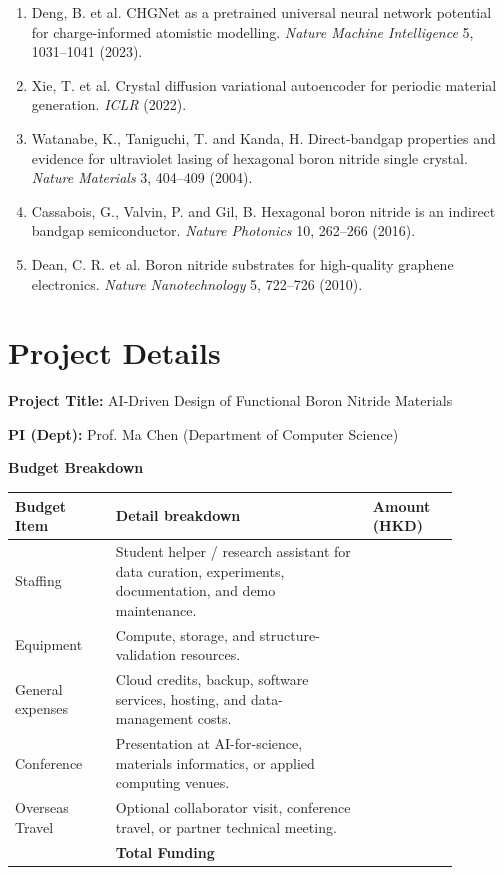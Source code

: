 \documentclass[10pt]{article}
\newcommand{\blank}[1][8em]{\colorbox{yellow!35}{\rule{0pt}{1.1em}\hspace{#1}}}
\begin{document}
\begin{enumerate}[leftmargin=1.2em,itemsep=1pt]
  \item Deng, B. et al. CHGNet as a pretrained universal neural network potential for charge-informed atomistic modelling. \textit{Nature Machine Intelligence} 5, 1031--1041 (2023).
  \item Xie, T. et al. Crystal diffusion variational autoencoder for periodic material generation. \textit{ICLR} (2022).
  \item Watanabe, K., Taniguchi, T. and Kanda, H. Direct-bandgap properties and evidence for ultraviolet lasing of hexagonal boron nitride single crystal. \textit{Nature Materials} 3, 404--409 (2004).
  \item Cassabois, G., Valvin, P. and Gil, B. Hexagonal boron nitride is an indirect bandgap semiconductor. \textit{Nature Photonics} 10, 262--266 (2016).
  \item Dean, C. R. et al. Boron nitride substrates for high-quality graphene electronics. \textit{Nature Nanotechnology} 5, 722--726 (2010).
\end{enumerate}
\normalsize

\section*{Project Details}
\textbf{Project Title:} AI-Driven Design of Functional Boron Nitride Materials

\textbf{PI (Dept):} Prof. Ma Chen (Department of Computer Science)

\textbf{Budget Breakdown}
\begin{center}
\small
\begin{tabular}{p{0.20\linewidth}p{0.51\linewidth}p{0.17\linewidth}}
\toprule
\textbf{Budget Item} & \textbf{Detail breakdown} & \textbf{Amount (HKD)} \\
\midrule
Staffing & Student helper / research assistant for data curation, experiments, documentation, and demo maintenance. & \blank \\
Equipment & Compute, storage, and structure-validation resources. & \blank \\
General expenses & Cloud credits, backup, software services, hosting, and data-management costs. & \blank \\
Conference & Presentation at AI-for-science, materials informatics, or applied computing venues. & \blank \\
Overseas Travel & Optional collaborator visit, conference travel, or partner technical meeting. & \blank \\
\midrule
 & \textbf{Total Funding} & \blank \\
\bottomrule
\end{tabular}
\end{center}
\end{document}
